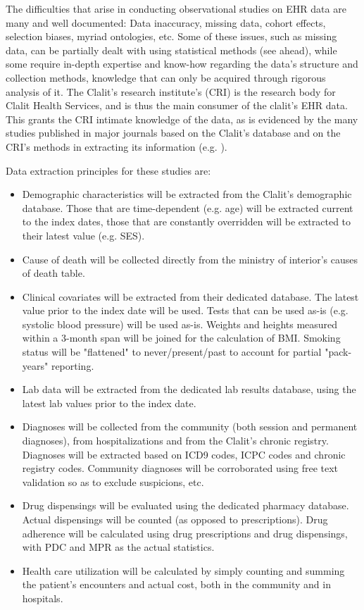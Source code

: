 \documentclass[a4paper,12pt]{article}
\begin{document}
	The difficulties that arise in conducting observational studies on EHR data are many and well documented: Data inaccuracy, missing data, cohort effects, selection biases, myriad ontologies, etc\cite{Hripcsak2011,Jensen2012,Goldstein2017}. Some of these issues, such as missing data, can be partially dealt with using statistical methods (see ahead), while some require in-depth expertise and know-how regarding the data's structure and collection methods, knowledge that can only be acquired through rigorous analysis of it. The Clalit's research institute's (CRI) is the research body for Clalit Health Services, and is thus the main consumer of the clalit's EHR data. This grants the CRI intimate knowledge of the data, as is evidenced by the many studies published in major journals based on the Clalit's database and on the CRI's methods in extracting its information (e.g. \cite{Reges2018,Dagan2017}).
	
	Data extraction principles for these studies are:
	\begin{itemize}
		\item Demographic characteristics will be extracted from the Clalit's demographic database. Those that are time-dependent (e.g. age) will be extracted current to the index dates, those that are constantly overridden will be extracted to their latest value (e.g. SES).
		\item Cause of death will be collected directly from the ministry of interior's causes of death table.
		\item Clinical covariates will be extracted from their dedicated database. The latest value prior to the index date will be used. Tests that can be used as-is (e.g. systolic blood pressure) will be used as-is. Weights and heights measured within a 3-month span will be joined for the calculation of BMI. Smoking status will be "flattened" to never/present/past to account for partial "pack-years" reporting.
		\item Lab data will be extracted from the dedicated lab results database, using the latest lab values prior to the index date.
		\item Diagnoses will be collected from the community (both session and permanent diagnoses), from hospitalizations and from the Clalit's chronic registry\cite{Rennert2001}. Diagnoses will be extracted based on ICD9 codes, ICPC codes and chronic registry codes. Community diagnoses will be corroborated using free text validation so as to exclude suspicions, etc.
		\item Drug dispensings will be evaluated using the dedicated pharmacy database. Actual dispensings will be counted (as opposed to prescriptions). Drug adherence will be calculated using drug prescriptions and drug dispensings, with PDC and MPR as the actual statistics\cite{Lam2015}.
		\item Health care utilization will be calculated by simply counting and summing the patient's encounters and actual cost, both in the community and in hospitals.
	\end{itemize}
\end{document}
